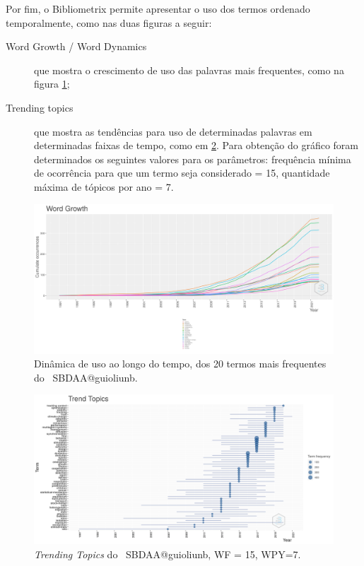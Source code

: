 Por fim, o Bibliometrix permite apresentar o uso dos termos ordenado temporalmente, como nas duas figuras a seguir:
\begin{description}
    \item [Word Growth / Word Dynamics] que mostra o crescimento de uso das palavras mais frequentes, como na figura \ref{fig:MASSA2-WordDynamics};
    \item [Trending topics] que mostra as tendências para uso de determinadas palavras em determinadas faixas de tempo, como em \ref{fig:MASSA2-TrendTopics}. Para obtenção do gráfico foram determinados os seguintes valores para os parâmetros: frequência mínima de ocorrência para que um termo seja considerado = 15, quantidade máxima de tópicos por ano = 7.
\end{description}

\begin{figure}
    \centering
    \includegraphics[width=1\textwidth]{experiments/jhcf/PesqBibliogr/SimulacaoMultiagente/WoS-20220203/Metricas/Documentos/MASSA2-WordDynamics.png}
    \caption{Dinâmica de uso ao longo do tempo, dos 20 termos mais frequentes do \dataset\ SBDAA@guioliunb.}
    \label{fig:MASSA2-WordDynamics}
\end{figure}

\begin{figure}
    \centering
    \includegraphics[angle=90,width=1\textwidth,height=0.93\textheight]{experiments/jhcf/PesqBibliogr/SimulacaoMultiagente/WoS-20220203/Metricas/Documentos/MASSA2-TrendTopics-WF=15:WPY=7.png}
    \caption{\textit{Trending Topics} do \dataset\ SBDAA@guioliunb, WF = 15, WPY=7.}
    \label{fig:MASSA2-TrendTopics}
\end{figure}

